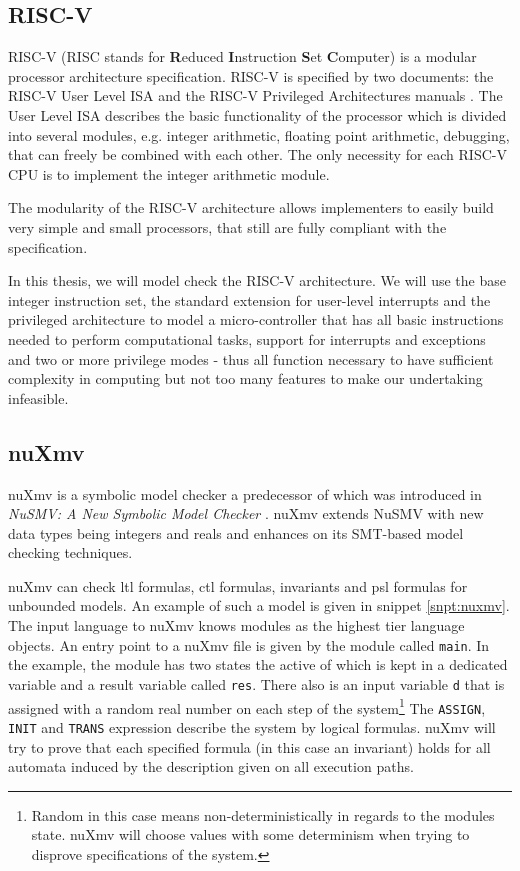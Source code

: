 \documentclass{securem}
\begin{document}
\subsection{RISC-V}

RISC-V (RISC stands for \textbf{R}educed \textbf{I}nstruction \textbf{S}et \textbf{C}omputer) is a modular processor architecture specification.
RISC-V is specified by two documents: the RISC-V User Level ISA \cite{RiscVISA} and the RISC-V Privileged Architectures manuals \cite{RiscVISAP}.
The User Level ISA describes the basic functionality of the processor which is divided into several modules, e.g. integer arithmetic, floating point arithmetic, debugging, that can freely be combined with each other.
The only necessity for each RISC-V CPU is to implement the integer arithmetic module.

The modularity of the RISC-V architecture allows implementers to easily build very simple and small processors, that still are fully compliant with the specification.

In this thesis, we will model check the RISC-V architecture.
We will use the base integer instruction set, the standard extension for user-level interrupts and the privileged architecture to model a micro-controller that has all basic instructions needed to perform computational tasks, support for interrupts and exceptions and two or more privilege modes - thus all function necessary to have sufficient complexity in computing but not too many features to make our undertaking infeasible.

\subsection{nuXmv}

nuXmv \cite{Cavada14} is a symbolic model checker a predecessor of which was introduced in \textit{NuSMV: A New Symbolic Model Checker} \cite{Cimatti2000}.
nuXmv extends NuSMV with new data types being integers and reals and enhances on its SMT-based model checking techniques.

nuXmv can check \gls{ltl} formulas, \gls{ctl} formulas, invariants and \gls{psl} formulas for unbounded models.
An example of such a model is given in snippet \ref{snpt:nuxmv}.
The input language to nuXmv knows modules as the highest tier language objects.
An entry point to a nuXmv file is given by the module called \texttt{main}.
In the example, the module has two states the active of which is kept in a dedicated variable and a result variable called \texttt{res}.
There also is an input variable \texttt{d} that is assigned with a random real number on each step of the system\footnote{%
    Random in this case means non-deterministically in regards to the modules state.
    nuXmv will choose values with some determinism when trying to disprove specifications of the system.
}
The \texttt{ASSIGN}, \texttt{INIT} and \texttt{TRANS} expression describe the system by logical formulas.
nuXmv will try to prove that each specified formula (in this case an invariant) holds for all automata induced by the description given on all execution paths.
\end{document}
